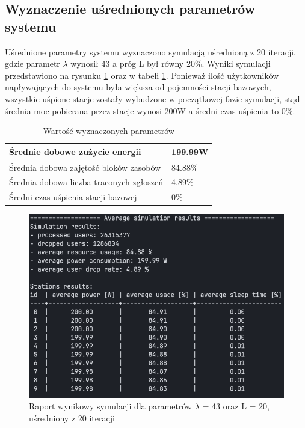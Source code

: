 \subsection{Wyznaczenie uśrednionych parametrów systemu} \label{get_params_section}
Uśrednione parametry systemu wyznaczono symulacją uśrednioną z 20 iteracji, gdzie parametr $\lambda$ wynosił 43 a próg L był równy 20\%. Wyniki symulacji przedstawiono na rysunku \ref{sim_results_average} oraz w tabeli \ref{params_table}. Ponieważ ilość użytkowników napływających do systemu była większa od pojemności stacji bazowych, wszystkie uśpione stacje zostały wybudzone w początkowej fazie symulacji, stąd średnia moc pobierana przez stacje wynosi 200W a średni czas uśpienia to 0\%. 
\newline\newline
\begin{table}[h]
\caption{Wartość wyznaczonych parametrów}
\label{params_table}
\begin{center}
	\renewcommand{\arraystretch}{1.5}
	\begin{tabular}{|l|l|}
	\hline 
	Średnie dobowe zużycie energii & 199.99W \\ 
	\hline 
	Średnia dobowa zajętość bloków zasobów & 84.88\% \\ 
	\hline 
	Średnia dobowa liczba traconych zgłoszeń & 4.89\% \\ 
	\hline 
	Średni czas uśpienia stacji bazowej & 0\% \\ 
	\hline 
	\end{tabular} 
\end{center}
\end{table}

\begin{figure}[h]
\center
\includegraphics[scale=0.6]{img/sim_results_sleep_lambda_43.png} 
\caption{Raport wynikowy symulacji dla parametrów $\lambda$ = 43 oraz L = 20, uśredniony z 20 iteracji}
\label{sim_results_average}
\end{figure}

